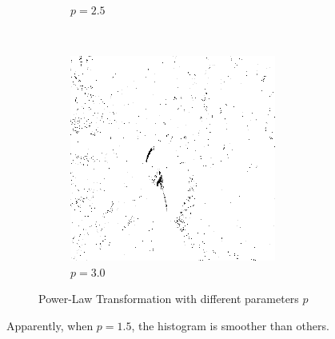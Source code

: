 \documentclass{article}
\begin{document}
\begin{enumerate}[label=(\alph*)]
\begin{figure}[!htb]
\begin{subfigure}[b]{0.3\textwidth}
            \caption{$p = 2.5$}
        \end{subfigure}
        ~
        \begin{subfigure}[b]{0.3\textwidth}
            \includegraphics[width=\textwidth]{img/PL30.png}
            \caption{$p = 3.0$}
        \end{subfigure}
        \caption{Power-Law Transformation with different parameters $p$}
        \label{Power-Law Transformation with different parameters $p$}        
    \end{figure}
    
    \newpage
    
    Apparently, when $p = 1.5$, the histogram is smoother than others.
    

\end{enumerate}
\end{document}
